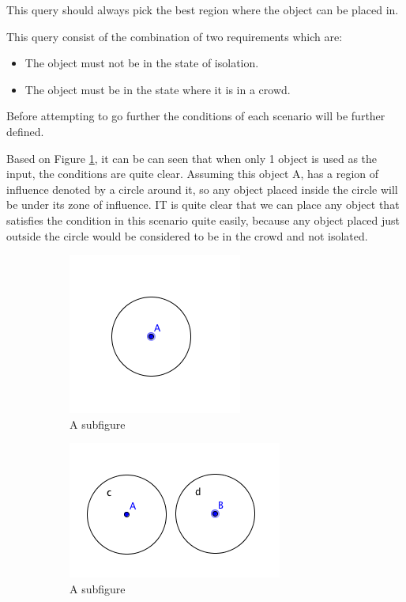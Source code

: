 \documentclass[a4paper,11pt]{article}
\begin{document}
This query should always pick the best region where the object can be placed in.

This query consist of the combination of two requirements which are:
\begin{itemize}
	\item The object must not be in the state of isolation.
	\item The object must be in the state where it is in a crowd.
\end{itemize}

Before attempting to go further the conditions of each scenario will be further defined. 

Based on Figure \ref{fig:1OOI}, it can be can seen that when only 1 object is used as the input, the conditions are quite clear. Assuming this object A, has a region of influence denoted by a circle around it, so any object placed inside the circle will be under its zone of influence. IT is quite clear that we can place any object that satisfies the condition in this scenario quite easily, because any object placed just outside the circle would be considered to be in the crowd and not isolated. 

\begin{figure}[h]
\centering
\begin{subfigure}{.4\textwidth}
  \centering
  \includegraphics[width=.4\linewidth]{1OOI}
  \caption{A subfigure}
  \label{fig:1OOI}
\end{subfigure}%
\begin{subfigure}{.4\textwidth}
  \centering
  \includegraphics[width=.4\linewidth]{2OOI}
  \caption{A subfigure}
  \label{fig:2OOI}
\end{subfigure}
\caption{}
\label{fig:Condition}
\end{figure}
\end{document}

